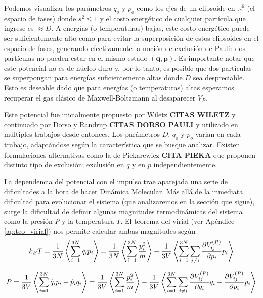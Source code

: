Podemos visualizar los parámetros $q_o$ y $p_o$ como los ejes de un elipsoide en $\mathbb{R}^6$ (el espacio de fases) donde $s^2 \leq 1$ y el costo energético de cualquier partícula
que ingrese es $\approx D$.
A energías (o temperaturas) bajas, este costo energético puede ser suficientemente alto como para evitar la superposición de estos elipsoides en el espacio de fases, generando efectivamente
la noción de exclusión de Pauli: dos partículas no pueden estar en el mismo estado $(\mathbf{q}, \mathbf{p})$.
Es importante notar que este potencial no es de núcleo duro y, por lo tanto, es posible que dos partículas se superpongan para energías suficientemente altas donde $D$ sea despreciable.
Esto es deseable dado que para energías (o temperaturas) altas esperamos recuperar el gas clásico de Maxwell-Boltzmann al desaparecer $V_P$.

Este potencial fue inicialmente propuesto por Wiletz \textbf{CITAS WILETZ} y continuado por Dorso y Randrup \textbf{CITAS DORSO PAULI} y utilizado en múltiples trabajos desde entonces.
Los parámetros $D$, $q_o$ y $p_o$ varian en cada trabajo, adaptándose según la característica que se busque analizar.
Existen formulaciones alternativas como la de Piekarewicz \textbf{CITA PIEKA} que proponen distinto tipo de exclusión; exclusión en $q$ y en $p$ independientemente.

La dependencia del potencial con el impulso trae aparejada una serie de dificultades a la hora de hacer Dinámica Molecular.
Más allá de la inmediata dificultad para evolucionar el sistema (que analizaremos en la sección que sigue), surge la dificultad de definir algunas magnitudes termodinámicas del
sistema como la presión $P$ y la temperatura $T$.
El teorema del virial (ver Apéndice \ref{ap:teo_virial}) nos permite calcular ambas magnitudes según
\begin{equation}{\label{eq:virial_T}}
k_B T =  \frac{1}{3N}\left<\sum_{i=1}^{3N} \dot{q}_ip_i \right>
=  \frac{1}{3N}\left<\sum_{i=1}^{3N} \frac{p_i^2}{m} \right> - \frac{1}{3V}\left< \sum_{i=1}^{3N}\sum_{j\neq i} \frac{\partial V_{ij}^{(P)}}{\partial p_i}p_i \right>
\end{equation}

\begin{equation}{\label{eq:virial_P}}
P = \frac{1}{3V}\left< \sum_{i=1}^{3N} \dot{q}_ip_i + \dot{p}_iq_i \right>
= \frac{1}{3V}\left< \sum_{i=1}^{3N} \frac{p_i^2}{m} \right> - \frac{1}{3V}\left< \sum_{i=1}^{3N}\sum_{j\neq i} \frac{\partial V_{ij}^{(P)}}{\partial q_i}q_i+\frac{\partial V_{ij}^{(P)}}{\partial p_i}p_i \right>
\end{equation}

